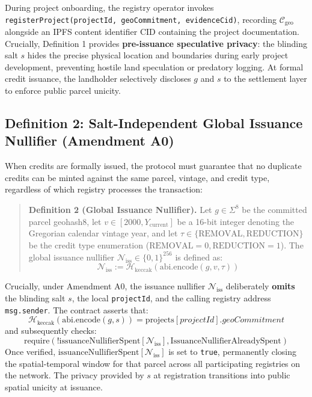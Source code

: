 \documentclass[preprint,12pt]{elsarticle}
\begin{document}
During project onboarding, the registry operator invokes \texttt{registerProject(projectId, geoCommitment, evidenceCid)}, recording $\mathcal{C}_{\text{geo}}$ alongside an IPFS content identifier $\text{CID}$ containing the project documentation. Crucially, Definition 1 provides \textbf{pre-issuance speculative privacy}: the blinding salt $s$ hides the precise physical location and boundaries during early project development, preventing hostile land speculation or predatory logging. At formal credit issuance, the landholder selectively discloses $g$ and $s$ to the settlement layer to enforce public parcel unicity.

\subsection{Definition 2: Salt-Independent Global Issuance Nullifier (Amendment A0)}

When credits are formally issued, the protocol must guarantee that no duplicate credits can be minted against the same parcel, vintage, and credit type, regardless of which registry processes the transaction:

\begin{quote}
\textbf{Definition 2 (Global Issuance Nullifier).} Let $g \in \Sigma^8$ be the committed parcel geohash8, let $v \in [2000, Y_{\text{current}}]$ be a 16-bit integer denoting the Gregorian calendar vintage year, and let $\tau \in \{\text{REMOVAL}, \text{REDUCTION}\}$ be the credit type enumeration ($\text{REMOVAL} = 0, \text{REDUCTION} = 1$). The global issuance nullifier $\mathcal{N}_{\text{iss}} \in \{0,1\}^{256}$ is defined as:
$$\mathcal{N}_{\text{iss}} := \mathcal{H}_{\text{keccak}}(\text{abi.encode}(g, v, \tau))$$
\end{quote}

Crucially, under Amendment A0, the issuance nullifier $\mathcal{N}_{\text{iss}}$ deliberately \textbf{omits} the blinding salt $s$, the local \texttt{projectId}, and the calling registry address \texttt{msg.sender}. The contract asserts that:
$$\mathcal{H}_{\text{keccak}}(\text{abi.encode}(g, s)) = \text{projects}[projectId].geoCommitment$$
and subsequently checks:
$$\text{require}(!\text{issuanceNullifierSpent}[\mathcal{N}_{\text{iss}}], \text{IssuanceNullifierAlreadySpent})$$
Once verified, $\text{issuanceNullifierSpent}[\mathcal{N}_{\text{iss}}]$ is set to \texttt{true}, permanently closing the spatial-temporal window for that parcel across all participating registries on the network. The privacy provided by $s$ at registration transitions into public spatial unicity at issuance.
\end{document}
